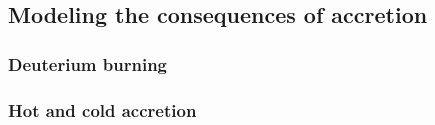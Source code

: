 \documentclass[12pt,a4paper]{article}
\newcommand{\mr}{\mathrm}
\newcommand{\fird}[2][]{\frac{\mathrm{d}#1}{\mathrm{d}#2}}
\newcommand{\pfird}[2][]{\frac{\partial#1}{\partial#2}}
\begin{document}
\subsection{Modeling the consequences of accretion}
\label{sec:accretion_modeling}





\subsubsection{Deuterium burning}
\label{sec:deuterium_burning}

\subsubsection{Hot and cold accretion}
\label{sec:hot_cold_accretion}

\end{document}
